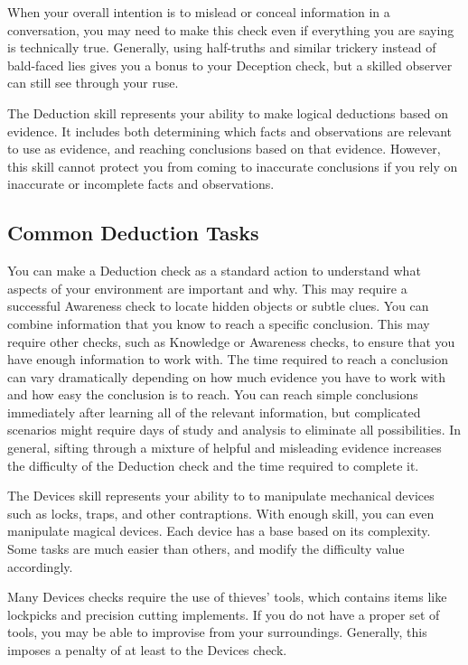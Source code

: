         When your overall intention is to mislead or conceal information in a conversation, you may need to make this check even if everything you are saying is technically true.
        Generally, using half-truths and similar trickery instead of bald-faced lies gives you a bonus to your Deception check, but a skilled observer can still see through your ruse.


\newpage
{}
    The Deduction skill represents your ability to make logical deductions based on evidence.
    It includes both determining which facts and observations are relevant to use as evidence, and reaching conclusions based on that evidence.
    However, this skill cannot protect you from coming to inaccurate conclusions if you rely on inaccurate or incomplete facts and observations.

    \subsection{Common Deduction Tasks}
         You can make a Deduction check as a standard action to understand what aspects of your environment are important and why.
        This may require a successful Awareness check to locate hidden objects or subtle clues.
         You can combine information that you know to reach a specific conclusion.
        This may require other checks, such as Knowledge or Awareness checks, to ensure that you have enough information to work with.
        The time required to reach a conclusion can vary dramatically depending on how much evidence you have to work with and how easy the conclusion is to reach.
        You can reach simple conclusions immediately after learning all of the relevant information, but complicated scenarios might require days of study and analysis to eliminate all possibilities.
        In general, sifting through a mixture of helpful and misleading evidence increases the difficulty of the Deduction check and the time required to complete it.

\newpage
{}
    The Devices skill represents your ability to to manipulate mechanical devices such as locks, traps, and other contraptions.
    With enough skill, you can even manipulate magical devices.
    Each device has a base  based on its complexity.
    Some tasks are much easier than others, and modify the difficulty value accordingly.

    Many Devices checks require the use of thieves' tools, which contains items like lockpicks and precision cutting implements.
    If you do not have a proper set of tools, you may be able to improvise from your surroundings.
    Generally, this imposes a penalty of at least  to the Devices check.

